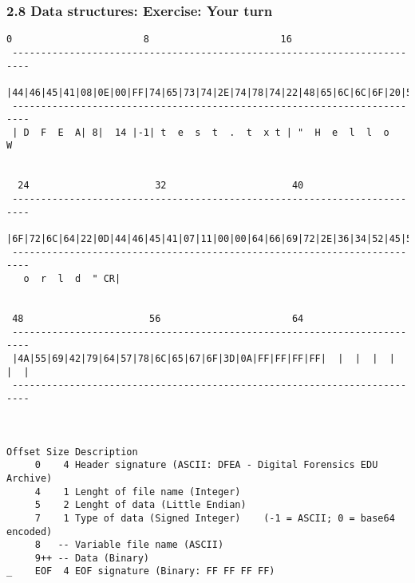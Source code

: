 \begin{frame}[fragile]
  \frametitle{2.8 Data structures: Exercise: Your turn}
\begin{lstlisting}[basicstyle=\tiny]
  0                       8                       16                      
 ------------------------------------------------------------------------- 
 |44|46|45|41|08|0E|00|FF|74|65|73|74|2E|74|78|74|22|48|65|6C|6C|6F|20|57|
 -------------------------------------------------------------------------
 | D  F  E  A| 8|  14 |-1| t  e  s  t  .  t  x t | "  H  e  l  l  o     W


  24                      32                      40
 -------------------------------------------------------------------------
 |6F|72|6C|64|22|0D|44|46|45|41|07|11|00|00|64|66|69|72|2E|36|34|52|45|5A|
 -------------------------------------------------------------------------
   o  r  l  d  " CR|


 48                      56                       64
 -------------------------------------------------------------------------
 |4A|55|69|42|79|64|57|78|6C|65|67|6F|3D|0A|FF|FF|FF|FF|  |  |  |  |  |  |
 -------------------------------------------------------------------------



Offset Size Description
     0    4 Header signature (ASCII: DFEA - Digital Forensics EDU Archive)
     4    1 Lenght of file name (Integer)
     5    2 Lenght of data (Little Endian)
     7    1 Type of data (Signed Integer)    (-1 = ASCII; 0 = base64 encoded)
     8   -- Variable file name (ASCII)
     9++ -- Data (Binary)
_    EOF  4 EOF signature (Binary: FF FF FF FF)
\end{lstlisting}
\end{frame}


